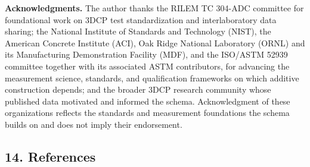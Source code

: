 \documentclass[
  11pt,
  letterpaper,
]{article}
\begin{document}
\textbf{Acknowledgments.} The author thanks the RILEM TC 304-ADC
committee for foundational work on 3DCP test standardization and
interlaboratory data sharing; the National Institute of Standards and
Technology (NIST), the American Concrete Institute (ACI), Oak Ridge
National Laboratory (ORNL) and its Manufacturing Demonstration Facility
(MDF), and the ISO/ASTM 52939 committee together with its associated
ASTM contributors, for advancing the measurement science, standards, and
qualification frameworks on which additive construction depends; and the
broader 3DCP research community whose published data motivated and
informed the schema. Acknowledgment of these organizations reflects the
standards and measurement foundations the schema builds on and does not
imply their endorsement.

\subsection{14. References}\label{references}
\end{document}
